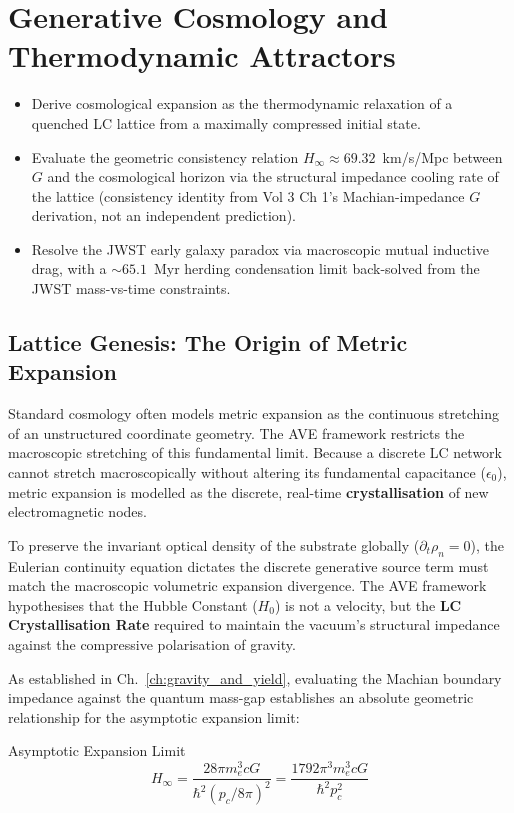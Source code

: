 \chapter{Generative Cosmology and Thermodynamic Attractors}
\label{ch:cosmology}


\begin{objectivebox}
\begin{itemize}
    \item Derive cosmological expansion as the thermodynamic relaxation of a quenched LC lattice from a maximally compressed initial state.
    \item Evaluate the geometric consistency relation $H_\infty \approx 69.32$~km/s/Mpc between $G$ and the cosmological horizon via the structural impedance cooling rate of the lattice (consistency identity from Vol 3 Ch 1's Machian-impedance $G$ derivation, not an independent prediction).
    \item Resolve the JWST early galaxy paradox via macroscopic mutual inductive drag, with a $\sim 65.1$~Myr herding condensation limit back-solved from the JWST mass-vs-time constraints.
\end{itemize}
\end{objectivebox}

\section{Lattice Genesis: The Origin of Metric Expansion}
Standard cosmology often models metric expansion as the continuous stretching of an unstructured coordinate geometry. The AVE framework restricts the macroscopic stretching of this fundamental limit. Because a discrete LC network cannot stretch macroscopically without altering its fundamental capacitance ($\epsilon_0$), metric expansion is modelled as the discrete, real-time \textbf{crystallisation} of new electromagnetic nodes.

To preserve the invariant optical density of the substrate globally ($\partial_t \rho_n = 0$), the Eulerian continuity equation dictates the discrete generative source term must match the macroscopic volumetric expansion divergence. The AVE framework hypothesises that the Hubble Constant ($H_0$) is not a velocity, but the \textbf{LC Crystallisation Rate} required to maintain the vacuum's structural impedance against the compressive polarisation of gravity.

As established in Ch.~\ref{ch:gravity_and_yield}, evaluating the Machian boundary impedance against the quantum mass-gap establishes an absolute geometric relationship for the asymptotic expansion limit:
\begin{resultbox}{Asymptotic Expansion Limit}
\begin{equation}
    H_{\infty} = \frac{28\pi m_e^3 c G}{\hbar^2 (p_c/8\pi)^2} = \frac{1792\pi^3 m_e^3 c G}{\hbar^2 p_c^2}
\end{equation}
\end{resultbox}

